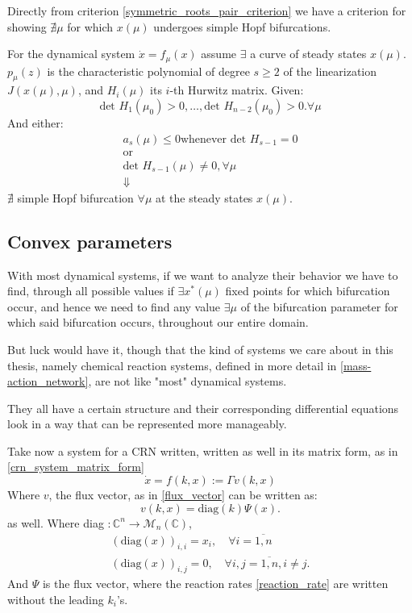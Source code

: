 Directly from criterion \ref{symmetric_roots_pair_criterion} we have a criterion for showing $\nexists \mu$ for which $x(\mu)$ undergoes simple Hopf bifurcations.
\begin{theorem}\label{ruling_out_simple_hopf_bif}

	For the dynamical system $\dot{x} = f_\mu(x)$ assume $\exists$ a curve of steady states $x(\mu)$.
	$p_\mu(z)$ is the characteristic polynomial of degree $s \geq 2$ of the linearization $J(x(\mu), \mu)$, and $H_i(\mu)$ its $i$-th Hurwitz matrix. Given:
	\[
		\text{det }H_1(\mu_0) > 0 , \dots, \text{det }H_{n-2} (\mu_0) > 0. \forall \mu
	\]
	And either:
	\begin{gather*}
		a_s(\mu) \leq 0 \text{whenever  det } H_{s-1} = 0  \\
		\text{or} \\
		\text{det }  H_{s-1}(\mu) \neq 0, \forall \mu    \\
		\Downarrow
	\end{gather*}
	$\nexists$ simple Hopf bifurcation $\forall \mu$ at the steady states $x(\mu)$.
\end{theorem}

\subsection{Convex parameters}\label{convex_paramteres}
With most dynamical systems, if we want to analyze their behavior we have to find, through all possible values if $\exists x^*(\mu)$ fixed points for which bifurcation occur, and hence we need to find any value $\exists \mu$ of the bifurcation parameter for which said bifurcation occurs, throughout our entire domain.

But luck would have it, though that the kind of systems we care about in this thesis, namely chemical reaction systems, defined in more detail in \ref{mass-action_network}, are not like "most" dynamical systems.

They all have a certain structure and their corresponding differential equations look in a way that can be represented more manageably.

Take now a system for a CRN written, written as well in its matrix form, as in \ref{crn_system_matrix_form}
\[
	\dot{x} = f(k,x) :=\Gamma v(k,x)
\]
Where $v$, the flux vector, as in \ref{flux_vector} can be written as:
\[
	v(k, x) = \text{diag}(k)\Psi(x).
\]
as well.
Where diag $: \mathbb{C}^n \rightarrow \mathcal{M}_n(\mathbb{C})$,
\begin{align*}
	(\text{diag}(x))_{i,i} = x_i, \quad \forall i = \overline{1,n} \\
	(\text{diag}(x))_{i,j} = 0, \quad \forall i,j = \overline{1,n} , i \neq j.
\end{align*}
And $\Psi$ is the flux vector, where the reaction rates \ref{reaction_rate} are written without the leading $k_i$'s.

